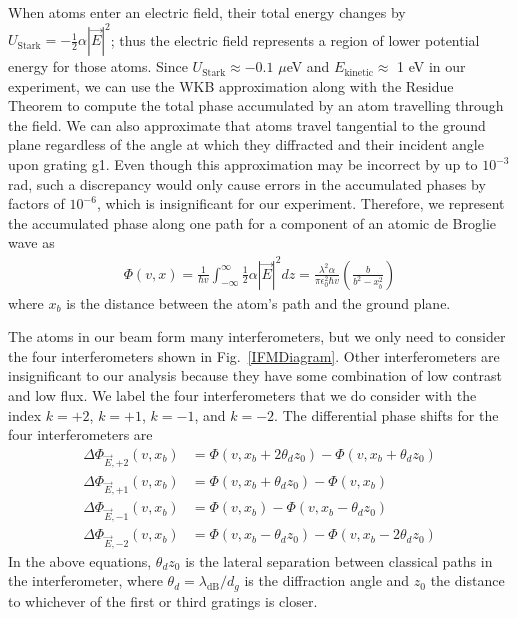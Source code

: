 \documentclass[twocolumn,prl,showpacs,superscriptaddress]{revtex4-1}   %
\newcommand{\figref}[1]{Fig.~\ref{#1}}
\begin{document}
When atoms enter an electric field, their total energy changes by $U_{\mathrm{Stark}} = -\frac{1}{2}\alpha|\vec{E}|^2$; thus the electric field represents a region of lower potential energy for those atoms.
Since $U_{\mathrm{Stark}} \approx -0.1$ $\mu$eV and $E_{\mathrm{kinetic}} \approx$ 1 eV in our experiment, we can use the WKB approximation along with the Residue Theorem to compute the total phase accumulated by an atom travelling through the field.
We can also approximate that atoms travel tangential to the ground plane regardless of the angle at which they diffracted and their incident angle upon grating g1. Even though this approximation may be incorrect by up to $10^{-3}$ rad, such a discrepancy would only cause errors in the accumulated phases by factors of $10^{-6}$, which is insignificant for our experiment.
Therefore, we represent the accumulated phase along one path for a component of an atomic de Broglie wave as
\begin{align}
	\Phi(v,x) = 
	\frac{1}{\hbar v} \int_{-\infty}^{\infty} \frac{1}{2} \alpha |\vec{E}|^2 dz =	
	\frac{\lambda^2 \alpha}{\pi \epsilon_0^2 \hbar v}
	\left( \frac{b}{b^2-x_b^2} \right)
	\label{accumPhasePillars}
\end{align}
where $x_b$ is the distance between the atom's path and the ground plane.

The atoms in our beam form many interferometers, but we only need to consider the four interferometers shown in \figref{IFMDiagram}. 
Other interferometers are insignificant to our analysis because they have some combination of low contrast and low flux.
We label the four interferometers that we do consider with the index $k=+2$, $k=+1$, $k=-1$, and $k=-2$. 
The differential phase shifts for the four interferometers are
\begin{align}
	\Delta\Phi_{\vec{E},+2}(v,x_b) &= \Phi(v, x_b+2\theta_d z_0) - \Phi(v, x_b+\theta_d z_0) \nonumber \\
	\Delta\Phi_{\vec{E},+1}(v,x_b) &= \Phi(v, x_b+\theta_d z_0) - \Phi(v, x_b) \nonumber \\
	\Delta\Phi_{\vec{E},-1}(v,x_b) &= \Phi(v, x_b) - \Phi(v, x_b-\theta_d z_0) \nonumber \\
	\Delta\Phi_{\vec{E},-2}(v,x_b) &= \Phi(v, x_b-\theta_d z_0) - \Phi(v, x_b-2\theta_d z_0)
	\label{deltaPhasePillars}
\end{align}
In the above equations, $\theta_d z_0$ is the lateral separation between classical paths in the interferometer, where $\theta_d = \lambda_{\mathrm{dB}} / d_g$ is the diffraction angle and $z_0$ the distance to whichever of the first or third gratings is closer.
\end{document}
